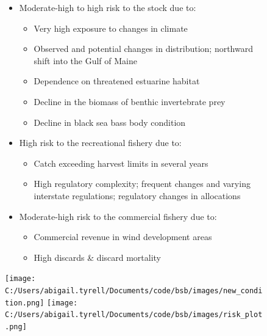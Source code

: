 \documentclass[
  10pt,
  letterpaper,
  DIV=11,
  numbers=noendperiod]{scrartcl}
\providecommand{\tightlist}{%
  \setlength{\itemsep}{0pt}\setlength{\parskip}{0pt}}\usepackage{longtable,booktabs,array}
\begin{document}
\begin{figure}
\begin{minipage}{0.57\linewidth}
\begin{itemize}
\tightlist
\item
  Moderate-high to high risk to the stock due to:

  \begin{itemize}
  \tightlist
  \item
    Very high exposure to changes in climate
  \item
    Observed and potential changes in distribution; northward shift into
    the Gulf of Maine
  \item
    Dependence on threatened estuarine habitat
  \item
    Decline in the biomass of benthic invertebrate prey
  \item
    Decline in black sea bass body condition
  \end{itemize}
\item
  High risk to the recreational fishery due to:

  \begin{itemize}
  \tightlist
  \item
    Catch exceeding harvest limits in several years
  \item
    High regulatory complexity; frequent changes and varying interstate
    regulations; regulatory changes in allocations
  \end{itemize}
\item
  Moderate-high risk to the commercial fishery due to:

  \begin{itemize}
  \tightlist
  \item
    Commercial revenue in wind development areas
  \item
    High discards \& discard mortality
  \end{itemize}
\end{itemize}

\end{minipage}%
%
\begin{minipage}{0.03\linewidth}

\hfill

\end{minipage}%
%
\begin{minipage}{0.40\linewidth}
\texttt{[image: C:/Users/abigail.tyrell/Documents/code/bsb/images/new\_condition.png]}
\texttt{[image: C:/Users/abigail.tyrell/Documents/code/bsb/images/risk\_plot.png]}\end{minipage}%

\end{figure}%
\end{document}
